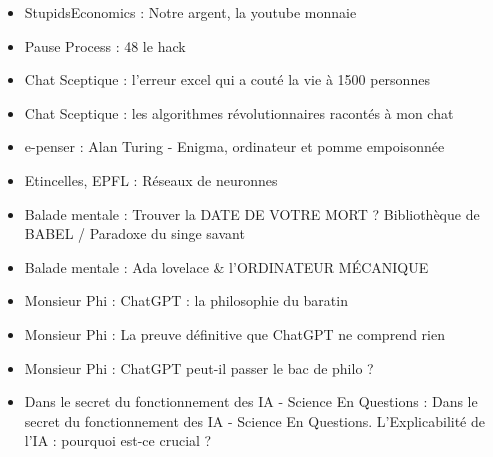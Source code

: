 \begin{itemize}
    \item StupidsEconomics : Notre argent, la youtube monnaie 
    \item Pause Process : 48 le hack
    \item Chat Sceptique : l'erreur excel qui a couté la vie à 1500 personnes
    \item Chat Sceptique : les algorithmes révolutionnaires racontés à mon chat
    \item e-penser : Alan Turing - Enigma, ordinateur et pomme empoisonnée
    \item Etincelles, EPFL : Réseaux de neuronnes
    \item Balade mentale : Trouver la DATE DE VOTRE MORT ? Bibliothèque de BABEL / Paradoxe du singe savant
    \item Balade mentale : Ada lovelace \& l'ORDINATEUR MÉCANIQUE
    \item Monsieur Phi : ChatGPT : la philosophie du baratin
    \item Monsieur Phi : La preuve définitive que ChatGPT ne comprend rien
    \item Monsieur Phi : ChatGPT peut-il passer le bac de philo ?
    \item Dans le secret du fonctionnement des IA - Science En Questions : Dans le secret du fonctionnement des IA - Science En Questions. L’Explicabilité de l’IA : pourquoi est-ce crucial ?
\end{itemize}

